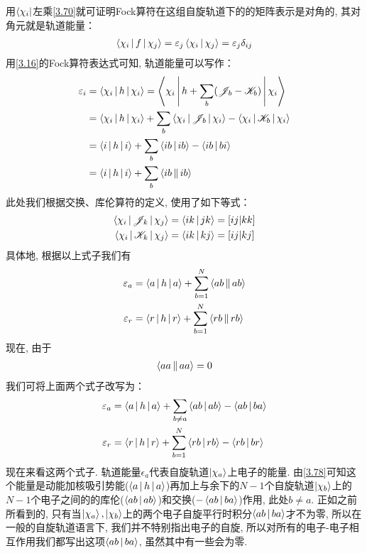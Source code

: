 用$\Bra{\chi_i}$左乘\autoref{3.70}就可证明Fock算符在这组自旋轨道下的的矩阵表示是对角的, 
其对角元就是轨道能量：
\begin{align}
	\Braket{\chi_i|f|\chi_j} = \varepsilon_j\Braket{\chi_i|\chi_j} = \varepsilon_j\delta_{ij}
\end{align}
用\autoref{3.16}的Fock算符表达式可知, 
轨道能量可以写作：
\begin{align}
	\varepsilon_i & = \Braket{\chi_i|h|\chi_i} = \Braket{\chi_i|h+\sum_b(\mathscr{J}_b-\mathscr{K}_b)|\chi_i}\notag\\
	& = \Braket{\chi_i|h|\chi_i} + \sum_b\Braket{\chi_i|\mathscr{J}_b|\chi_i} - \Braket{\chi_i|\mathscr{K}_b|\chi_i}\notag\\
	& = \Braket{i|h|i} + \sum_b\Braket{ib|ib} - \Braket{ib|bi}\notag\\
	& = \Braket{i|h|i} + \sum_b\Braket{ib||ib}
	\label{3.72}
\end{align}
此处我们根据交换、库伦算符的定义, 
使用了如下等式：
\begin{align}
	\Braket{\chi_i|\mathscr{J}_k|\chi_j} & = \Braket{ik|jk} = [ij|kk]\\
	\Braket{\chi_i|\mathscr{K}_k|\chi_j} & = \Braket{ik|kj} = [ij|kj]
\end{align}
具体地, 
根据以上式子我们有
\begin{align}
	\label{3.75}
	\varepsilon_a & = \Braket{a|h|a} + \sum_{b=1}^{N}\Braket{ab||ab}\\
	\varepsilon_r & = \Braket{r|h|r} + \sum_{b=1}^{N}\Braket{rb||rb}
	\label{3.76}
\end{align}
现在, 
由于
\begin{align}
	\Braket{aa||aa} = 0
\end{align}
我们可将上面两个式子改写为：
\begin{align}
	\label{3.78}
	\varepsilon_a & = \Braket{a|h|a} + \sum_{b\neq a}\Braket{ab|ab} - \Braket{ab|ba}\\
	\varepsilon_r & = \Braket{r|h|r} + \sum_{b=1}^{N}\Braket{rb|rb} - \Braket{rb|br}
	\label{3.79}
\end{align}
现在来看这两个式子. 
轨道能量$\epsilon_a$代表自旋轨道$\Ket{\chi_a}$上电子的能量. 
由\autoref{3.78}可知这个能量是动能加核吸引势能($\Braket{a|h|a}$)再加上与余下的$N-1$个自旋轨道$\Ket{\chi_b}$上的$N-1$个电子之间的的库伦($\Braket{ab|ab}$)和交换($-\Braket{ab|ba}$)作用, 
此处$b \neq a$. 
正如之前所看到的, 
只有当$\Ket{\chi_a},\Ket{\chi_b}$上的两个电子自旋平行时积分$\Braket{ab|ba}$才不为零, 
所以在一般的自旋轨道语言下, 
我们并不特别指出电子的自旋, 
所以对所有的电子-电子相互作用我们都写出这项$\Braket{ab|ba}$, 
虽然其中有一些会为零.


